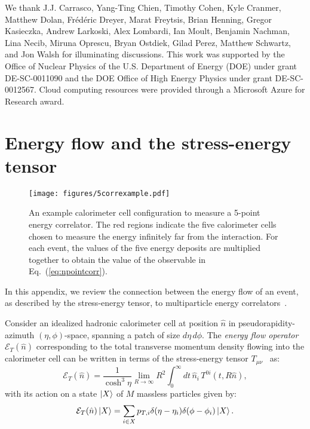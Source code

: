 \documentclass[letterpaper,11pt]{article}
\DeclareRobustCommand{\Eq}[1]{Eq.~(\ref{#1})}
\begin{document}
\acknowledgments
 
We thank J.J. Carrasco, Yang-Ting Chien, Timothy Cohen, Kyle Cranmer, Matthew Dolan, Fr\'ed\'eric Dreyer, Marat Freytsis, Brian Henning, Gregor Kasieczka, Andrew Larkoski, Alex Lombardi, Ian Moult, Benjamin Nachman, Lina Necib, Miruna Oprescu, Bryan Ostdiek, Gilad Perez, Matthew Schwartz, and Jon Walsh for illuminating discussions.
%
This work was supported by the Office of Nuclear Physics of the U.S. Department of Energy (DOE) under grant DE-SC-0011090 and the DOE Office of High Energy Physics under grant DE-SC-0012567.
%
Cloud computing resources were provided through a Microsoft Azure for Research award.

\appendix

\section{Energy flow and the stress-energy tensor}
\label{sec:stressenergy}

\begin{figure}[t]
\centering
\texttt{[image: figures/5correxample.pdf]}
\caption{An example calorimeter cell configuration to measure a 5-point energy correlator. The red regions indicate the five calorimeter cells chosen to measure the energy infinitely far from the interaction. For each event, the values of the five energy deposits are multiplied together to obtain the value of the observable in \Eq{eq:npointcorr}.}
\label{fig:5correxample}
\end{figure}

In this appendix, we review the connection between the energy flow of an event, as described by the stress-energy tensor, to multiparticle energy correlators~\cite{Tkachov:1995kk,Sveshnikov:1995vi,Cherzor:1997ak,Tkachov:1999py}.

Consider an idealized hadronic calorimeter cell at position $\hat n$ in pseudorapidity-azimuth $(\eta,\phi)$-space, spanning a patch of size $d\eta\,d\phi$. The \emph{energy flow operator} $\mathcal E_T(\hat n)$ corresponding to the total transverse momentum density flowing into the calorimeter cell can be written in terms of the stress-energy tensor $T_{\mu\nu}$~\cite{Sveshnikov:1995vi,Korchemsky:1997sy,Lee:2006nr,Bauer:2008dt,Mateu:2012nk} as:
\begin{equation}\label{eq:energyflow}
\mathcal E_T(\hat n) = \frac{1}{\cosh^3  \eta} \lim_{R\to\infty} R^2\int_0^\infty dt\, \hat n_i\, T^{0i}(t, R\hat n),
\end{equation}
with its action on a state $\ket X$ of $M$ massless particles given by:
\begin{equation}\label{eq:transcal}
\mathcal E_T(\hat n) \ket X = \sum_{i\in X} p_{T,i} \delta(\eta -  \eta_i)\delta(\phi - \phi_i) \ket X.
\end{equation}
\end{document}
